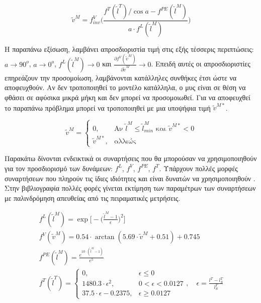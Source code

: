 \begin{equation}
    \tilde{v}^{M} = f^{V}_{inv} \bigg(\frac{f^{T}(\tilde{l}^{T})/\cos{a} - f^{PE}(\tilde{l}^{M})}{a \cdot f^{L}(\tilde{l}^{M})} \bigg)
    \label{equ:velocity-solution}
\end{equation}

Η παραπάνω εξίσωση, λαμβάνει απροσδιοριστία τιμή στις εξής τέσσερις περιπτώσεις: $a\rightarrow 90^{o}$, $a\rightarrow 0^{o}$, $f^{L}(\tilde{l}^{M})\rightarrow 0$ και $\frac{\partial f^{V}(\tilde{v}^{M})}{\partial \tilde{v}^{M}}\rightarrow 0$. Επειδή αυτές οι απροσδιοριστίες επηρεάζουν την προσομοίωση, λαμβάνονται κατάλληλες συνθήκες έτσι ώστε να αποφευχθούν. Αν δεν τροποποιηθεί το μοντέλο κατάλληλα, ο μυς είναι σε θέση να φθάσει σε αφύσικα μικρά μήκη και δεν μπορεί να προσομοιωθεί. Για να αποφευχθεί το παραπάνω πρόβλημα μπορεί να τροποποιηθεί με μια υποψήφια τιμή $\tilde{v}^{M*}$.

\begin{equation}
    \tilde{v}^{M} =
    \begin{cases}
        0, & \text{Αν } \tilde{l}^{M} \leq \tilde{l}^{M}_{min} \text{ και } \tilde{v}^{M*} < 0\\
        \tilde{v}^{M*}, & \text{αλλιώς}
    \end{cases}
    \label{equ:velocity-solution-adjustment}
\end{equation}

Παρακάτω δίνονται ενδεικτικά οι συναρτήσεις που θα μπορούσαν να χρησιμοποιηθούν για τον προσδιορισμό των δυνάμεων: $f^{L}$, $f^{V}$, $f^{PE}$, $f^{T}$. Υπάρχουν πολλές μορφές συναρτήσεων που πληρούν τις ίδιες ιδιότητες και είναι δυνατών να χρησιμοποιηθούν \cite{dinguo13}. Στην βιβλιογραφία πολλές φορές γίνεται εκτίμηση των παραμέτρων των συναρτήσεων με παλινδρόμηση απευθείας από τις πειραματικές μετρήσεις.

\begin{equation}
    \begin{gathered}
        f^{L}(\tilde{l}^{M}) = \exp \bigg[-\bigg( \frac{\tilde{l}^{M}-1}{\epsilon} \bigg)^{2}\bigg]\\[10pt]
        f^{V}(\tilde{v}^{M}) = 0.54 \cdot \arctan (5.69 \cdot \tilde{v}^{M} + 0.51) + 0.745\\[10pt]
        f^{PE}(\tilde{l}^{M}) = \frac{e^{10 \cdot (\tilde{l}^{M} - 1)}}{e^{5}}\\[10pt]
        f^{T}(\tilde{l}^{T}) =
        \begin{cases}
            0, & \epsilon \leq 0\\
            1480.3 \cdot \epsilon^{2}, & 0 < \epsilon < 0.0127\\
            37.5 \cdot \epsilon − 0.2375, & \epsilon \geq 0.0127
        \end{cases}
        , \quad \epsilon = \frac{l^{T} - l^{T}_{S}}{l^{T}_{S}}
    \end{gathered}
    \label{equ:force-functions}
\end{equation}

